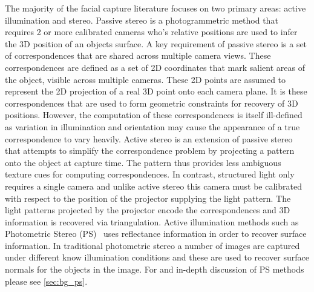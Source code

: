 The majority of the facial capture literature focuses on two primary areas:
active illumination and
stereo. Passive stereo is a photogrammetric method that requires 2 or more
calibrated cameras who's relative positions are used to infer the 3D position of
an objects surface. A key requirement of passive stereo is a set of
correspondences that are shared across multiple camera views. These
correspondences are defined as a set of 2D coordinates that mark salient areas
of the object, visible across multiple cameras. These 2D points are assumed to
represent the 2D projection of a real 3D point onto each camera plane. It is
these correspondences that are used to form geometric constraints for recovery
of 3D positions. However, the computation of these correspondences is itself
ill-defined as variation in illumination and orientation may cause the
appearance of a true correspondence to vary heavily. Active stereo is an
extension of passive stereo that attempts to simplify the correspondence problem
by projecting a pattern onto the object at capture time. The pattern thus
provides less ambiguous texture cues for computing correspondences. In contrast,
structured light only requires a single camera and unlike active stereo this
camera must be calibrated with respect to the position of the projector
supplying the light pattern. The light patterns projected by the projector
encode the correspondences and 3D information is recovered via triangulation.
Active illumination methods such as
Photometric Stereo (PS)~\cite{woodham1980photometric} uses reflectance
information in order to recover surface information. In traditional photometric
stereo a number of images are captured under different know illumination
conditions and these are used to recover surface normals for the objects in the
image. For and in-depth discussion of PS methods please see
\cref{sec:bg_ps}.


